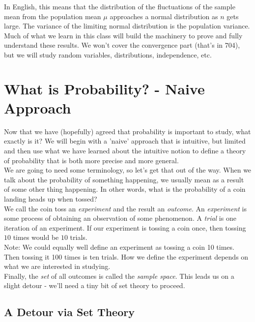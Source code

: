\documentclass[12pt]{article} %
\begin{document}
In English, this means that the distribution of the fluctuations of the sample mean from the population mean $\mu$ approaches a normal distribution as $n$ gets large. The variance of the limiting normal distribution is the population variance.\\

Much of what we learn in this class will build the machinery to prove and fully understand these results. We won't cover the convergence part (that's in 704), but we will study random variables, distributions, independence, etc.\\

\section{What is Probability? - Naive Approach}
Now that we have (hopefully) agreed that probability is important to study, what exactly is it? We will begin with a 'naive' approach that is intuitive, but limited and then use what we have learned about the intuitive notion to define a theory of probability that is both more precise and more general.\\

We are going to need some terminology, so let's get that out of the way. When we talk about the probability of something happening, we usually mean as a result of some other thing happening. In other words, what is the probability of a coin landing heads up when tossed?\\

We call the coin toss an \emph{experiment} and the result an \emph{outcome}. An \emph{experiment} is some process of obtaining an observation of some phenomenon. A \emph{trial} is one iteration of an experiment. If our experiment is tossing a coin once, then tossing $10$ times would be $10$ trials.\\

Note: We could equally well define an experiment as tossing a coin 10 times. Then tossing it 100 times is ten trials. How we define the experiment depends on what we are interested in studying. \\

Finally, the \emph{set} of all outcomes is called the \emph{sample space}. This leads us on a slight detour - we'll need a tiny bit of set theory to proceed.

\subsection{A Detour via Set Theory}
\end{document}
